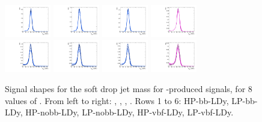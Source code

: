\begin{figure}[htbp]
  \includegraphics[width=0.18\textwidth]{fig/analysisAppendix/templateSignalVsMX_fromDC_VBFGbuToWW_MJJ_mu_HP_vbf_LDy.pdf}
  \includegraphics[width=0.18\textwidth]{fig/analysisAppendix/templateSignalVsMX_fromDC_VBFRadToWW_MJJ_mu_HP_vbf_LDy.pdf}
  \includegraphics[width=0.18\textwidth]{fig/analysisAppendix/templateSignalVsMX_fromDC_VBFZprToWW_MJJ_mu_HP_vbf_LDy.pdf}
  \includegraphics[width=0.18\textwidth]{fig/analysisAppendix/templateSignalVsMX_fromDC_VBFWprToWZ_MJJ_mu_HP_vbf_LDy.pdf}\\
  \includegraphics[width=0.18\textwidth]{fig/analysisAppendix/templateSignalVsMX_fromDC_VBFGbuToWW_MJJ_mu_LP_vbf_LDy.pdf}
  \includegraphics[width=0.18\textwidth]{fig/analysisAppendix/templateSignalVsMX_fromDC_VBFRadToWW_MJJ_mu_LP_vbf_LDy.pdf}
  \includegraphics[width=0.18\textwidth]{fig/analysisAppendix/templateSignalVsMX_fromDC_VBFZprToWW_MJJ_mu_LP_vbf_LDy.pdf}
  \includegraphics[width=0.18\textwidth]{fig/analysisAppendix/templateSignalVsMX_fromDC_VBFWprToWZ_MJJ_mu_LP_vbf_LDy.pdf}\\
  \caption{
    Signal shapes for the soft drop jet mass \MJ for \VBF-produced signals, for 8 values of \MX.
    From left to right: \GBulktoWW, \RadtoWW, \ZprtoWW, \WprtoWZ.
    Rows 1 to 6: HP-bb-LDy, LP-bb-LDy, HP-nobb-LDy, LP-nobb-LDy, HP-vbf-LDy, LP-vbf-LDy.
  }
  \label{fig:MJJShapes_VBF_LDy}
\end{figure}

